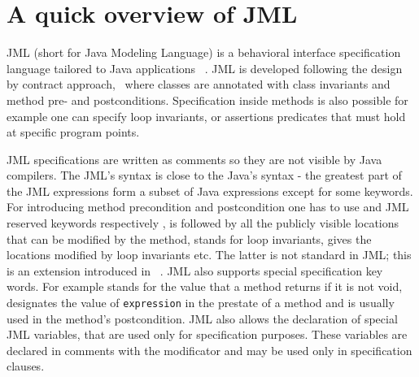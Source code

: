 \section{A quick overview of JML}\label{prelim}
JML (short for Java Modeling Language) is a behavioral interface specification language tailored to Java applications ~\cite{JMLRefMan}. JML is developed 
following the design by contract approach,~\cite{M97oos} where classes are annotated with class invariants and method pre- and postconditions. Specification
inside methods is also possible for example one can specify loop invariants, or assertions  predicates that must hold at specific program points. 

JML specifications are written as comments so they are not visible by Java compilers. The JML's syntax is close to the 
 Java's syntax - the greatest part of the JML expressions form a subset of Java expressions except for some keywords.
 For introducing method precondition and postcondition one has to use   and  JML reserved keywords respectively ,
   is followed by all the publicly visible locations that can be modified by the method, 
   stands for loop invariants,  gives  the locations modified by loop invariants etc. 
  The latter is not standard in JML; this is an extension introduced in  ~\cite{BRL-JACK}. JML also supports special specification
  key words. For example  stands for the value that a method returns if it is not void,  
  designates the value of \texttt{expression} in the prestate of a method and is usually used in the method's postcondition. 
  JML also allows the declaration of special JML variables, that are used only for specification purposes. 
These variables are declared in comments with the  modificator and may be used only in specification clauses. 

